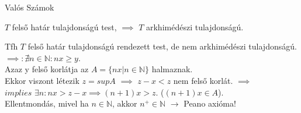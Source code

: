 \begin{frame}
\begin{tcolorbox}[title={Def.: Egész számok}]
\end{tcolorbox}

\begin{tcolorbox}[title={Ész}]
\end{tcolorbox}

\begin{tcolorbox}[title={Def.: Racionális számok}]
\end{tcolorbox}

\begin{tcolorbox}[title={Ész}]
\end{tcolorbox}
\end{frame}

\begin{frame}
\begin{tcolorbox}
{\Huge Valós Számok}
\end{tcolorbox}
\end{frame}

\begin{frame}
\begin{tcolorbox}[title={Def.: Rendezett test}]
\end{tcolorbox}

\begin{tcolorbox}[title={Def.: Arkhimédészi tulajdonság}]
\end{tcolorbox}

\begin{tcolorbox}[title={Def.: Felső határ tulajdonság}]
\end{tcolorbox}
\end{frame}

\begin{frame}
\begin{tcolorbox}[title={Tétel: Felső határ és arkhimédészi tulajdonság}]
$T$ felső határ tulajdonságú test, $\implies$ $T$ arkhimédészi tulajdonságú.
\end{tcolorbox}

\begin{tcolorbox}[title={Bizonyítás (Indirekt)}]
Tfh $T$ felső határ tulajdonságú rendezett test, de nem arkhimédészi tulajdonságú.\\
$\implies : {\nexists}n \in \mathbb{N} : nx \geq y$.\\
Azaz y felső korlátja az $A = \{ nx | n \in \mathbb{N} \}$ halmaznak.\\
Ekkor viszont létezik $z = sup A$ $\implies$ $z - x < z$ nem felső korlát. $\implies$\\
$implies$ ${\exists}n : nx > z - x \implies (n + 1)x > z$. ($(n + 1)x \in A$).\\
Ellentmondás, mivel ha $n \in \mathbb{N}$, akkor $n^+ \in \mathbb{N}$ $\rightarrow$ Peano axióma!
\end{tcolorbox}
\end{frame}

